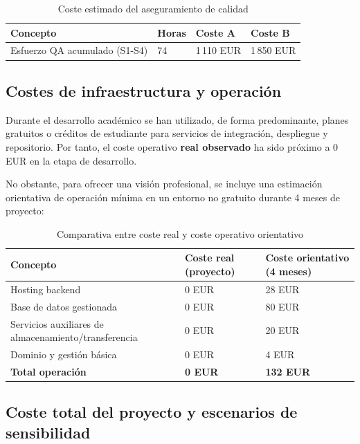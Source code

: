 \begin{table}[!htbp]
\centering
\begin{tabular}{|P{5.2cm}|P{2.2cm}|P{2.9cm}|P{2.9cm}|}
\hline
\textbf{Concepto} & \textbf{Horas} & \textbf{Coste A} & \textbf{Coste B} \\
\hline
Esfuerzo QA acumulado (S1-S4) & 74 & 1\,110 EUR & 1\,850 EUR \\
\hline
\end{tabular}
\caption{Coste estimado del aseguramiento de calidad}
\label{tab:coste-qa}
\end{table}

\subsection{Costes de infraestructura y operaci\'on}

Durante el desarrollo acad\'emico se han utilizado, de forma predominante,
planes gratuitos o cr\'editos de estudiante para servicios de integraci\'on,
despliegue y repositorio. Por tanto, el coste operativo \textbf{real observado}
ha sido pr\'oximo a 0 EUR en la etapa de desarrollo.

No obstante, para ofrecer una visi\'on profesional,
se incluye una estimaci\'on orientativa de operaci\'on m\'inima en un entorno no gratuito
durante 4 meses de proyecto:

\begin{table}[!htbp]
\centering
\begin{tabular}{|P{5.2cm}|P{3.2cm}|P{3.2cm}|}
\hline
\textbf{Concepto} & \textbf{Coste real (proyecto)} & \textbf{Coste orientativo (4 meses)} \\
\hline
Hosting backend & 0 EUR & 28 EUR \\
\hline
Base de datos gestionada & 0 EUR & 80 EUR \\
\hline
Servicios auxiliares de almacenamiento/transferencia & 0 EUR & 20 EUR \\
\hline
Dominio y gesti\'on b\'asica & 0 EUR & 4 EUR \\
\hline
\textbf{Total operaci\'on} & \textbf{0 EUR} & \textbf{132 EUR} \\
\hline
\end{tabular}
\caption{Comparativa entre coste real y coste operativo orientativo}
\label{tab:coste-operativo}
\end{table}

\subsection{Coste total del proyecto y escenarios de sensibilidad}

